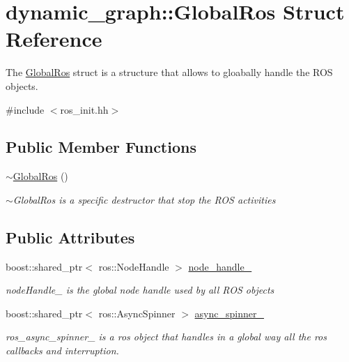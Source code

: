 \hypertarget{structdynamic__graph_1_1GlobalRos}{}\section{dynamic\+\_\+graph\+:\+:Global\+Ros Struct Reference}
\label{structdynamic__graph_1_1GlobalRos}


The \hyperlink{structdynamic__graph_1_1GlobalRos}{Global\+Ros} struct is a structure that allows to gloabally handle the R\+OS objects.  




{\ttfamily \#include $<$ros\+\_\+init.\+hh$>$}

\subsection*{Public Member Functions}
\begin{DoxyCompactItemize}
\item 
\hyperlink{structdynamic__graph_1_1GlobalRos_ad2d7b476bb25e863b0aa7da247c2869c}{$\sim$\+Global\+Ros} ()\hypertarget{structdynamic__graph_1_1GlobalRos_ad2d7b476bb25e863b0aa7da247c2869c}{}\label{structdynamic__graph_1_1GlobalRos_ad2d7b476bb25e863b0aa7da247c2869c}

\begin{DoxyCompactList}\small\item\em $\sim$\+Global\+Ros is a specific destructor that stop the R\+OS activities \end{DoxyCompactList}\end{DoxyCompactItemize}
\subsection*{Public Attributes}
\begin{DoxyCompactItemize}
\item 
boost\+::shared\+\_\+ptr$<$ ros\+::\+Node\+Handle $>$ \hyperlink{structdynamic__graph_1_1GlobalRos_ac0f84eb7fdf20f2d5374d56a14c25b8d}{node\+\_\+handle\+\_\+}\hypertarget{structdynamic__graph_1_1GlobalRos_ac0f84eb7fdf20f2d5374d56a14c25b8d}{}\label{structdynamic__graph_1_1GlobalRos_ac0f84eb7fdf20f2d5374d56a14c25b8d}

\begin{DoxyCompactList}\small\item\em node\+Handle\+\_\+ is the global node handle used by all R\+OS objects \end{DoxyCompactList}\item 
boost\+::shared\+\_\+ptr$<$ ros\+::\+Async\+Spinner $>$ \hyperlink{structdynamic__graph_1_1GlobalRos_a9ad45d4ac3a50e943d3f2cb24f8281a3}{async\+\_\+spinner\+\_\+}
\begin{DoxyCompactList}\small\item\em ros\+\_\+async\+\_\+spinner\+\_\+ is a ros object that handles in a global way all the ros callbacks and interruption. \end{DoxyCompactList}\end{DoxyCompactItemize}


